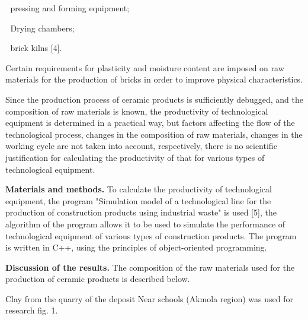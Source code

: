  pressing and forming equipment;

 Drying chambers;

 brick kilns {[}4{]}.

Certain requirements for plasticity and moisture content are imposed on
raw materials for the production of bricks in order to improve physical
characteristics.

Since the production process of ceramic products is sufficiently
debugged, and the composition of raw materials is known, the
productivity of technological equipment is determined in a practical
way, but factors affecting the flow of the technological process,
changes in the composition of raw materials, changes in the working
cycle are not taken into account, respectively, there is no scientific
justification for calculating the productivity of that for various types
of technological equipment.

{\bfseries Materials and methods.} To calculate the productivity of
technological equipment, the program "Simulation model of a
technological line for the production of construction products using
industrial waste" is used {[}5{]}, the algorithm of the program allows
it to be used to simulate the performance of technological equipment of
various types of construction products. The program is written in C++,
using the principles of object-oriented programming.

{\bfseries Discussion of the results.} The composition of the raw materials
used for the production of ceramic products is described below.

Clay from the quarry of the deposit Near schools (Akmola region) was
used for research fig. 1.

